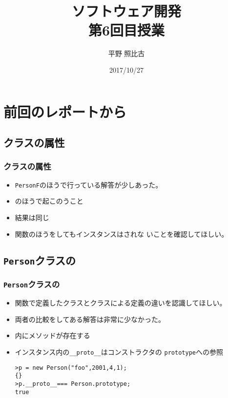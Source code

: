 %
%

\title{ソフトウェア開発\\第6回目授業}
\author{平野 照比古}
\institute{}
\date{2017/10/27}

\frame{\maketitle}
\section{前回のレポートから}
\subsection{クラスの属性}
\begin{frame}
 \frametitle{クラスの属性}
 \begin{itemize}
	\item \texttt{PersonF}のほうで行っている解答が少しあった。
	\item {}のほうで起このうこと
	\item 結果は同じ
	\item 関数のほうをしてもインスタンスはされな
				いことを確認してほしい。
 \end{itemize}
\end{frame}
\subsection{\texttt{Person}クラスの}
\begin{frame}[containsverbatim]
 \frametitle{\texttt{Person}クラスの}
 \begin{itemize}
	\item 関数で定義したクラスとクラスによる定義の違いを認識してほしい。
	\item 両者の比較をしてある解答は非常に少なかった。
  \item {}内にメソッドが存在する
  \item インスタンス内の\Verb+__proto__+はコンストラクタの
        \texttt{prototype}への参照
\begin{Verbatim}
>p = new Person("foo",2001,4,1);
{}
>p.__proto__=== Person.prototype;
true
\end{Verbatim}
\end{itemize}
\end{frame}
